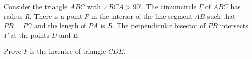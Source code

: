 Consider the triangle $ABC$ with $\angle BCA > 90^{\circ}$.  The circumcircle $\Gamma$ of $ABC$ has radius $R$.  There is a point $P$ in the interior of the line segment $AB$ such that $PB = PC$ and the length of $PA$ is $R$.  The perpendicular bisector of $PB$ intersects $\Gamma$ at the points $D$ and $E$.

Prove $P$ is the incentre of triangle $CDE$.